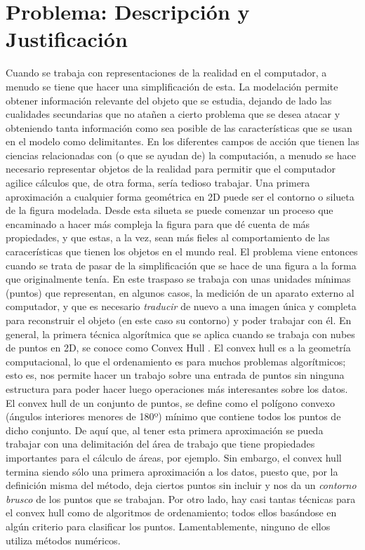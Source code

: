 \documentclass[final, 12pt letterpaper]{article}
\begin{document}
\section{Problema: Descripción y Justificación}
Cuando se trabaja con representaciones de la realidad en el computador, a menudo se tiene que hacer una simplificación de esta. La modelación permite obtener información relevante del objeto que se estudia, dejando de lado las cualidades secundarias que no atañen a cierto problema que se desea atacar y obteniendo tanta información como sea posible de las características que se usan en el modelo como delimitantes.
\newline
En los diferentes campos de acción que tienen las ciencias relacionadas con (o que se ayudan de) la computación, a menudo se hace necesario representar objetos de la realidad para permitir que el computador agilice cálculos que, de otra forma, sería tedioso trabajar. Una primera aproximación a cualquier forma geométrica en 2D puede ser el contorno o silueta de la figura modelada. Desde esta silueta se puede comenzar un proceso que encaminado a hacer más compleja la figura para que dé cuenta de más propiedades, y que estas, a la vez, sean más fieles al comportamiento de las caracerísticas que tienen los objetos en el mundo real.
\newline
El problema viene entonces cuando se trata de pasar de la simplificación que se hace de una figura a la forma que originalmente tenía. En este traspaso se trabaja con unas unidades mínimas (puntos) que representan, en algunos casos, la medición de un aparato externo al computador, y que es necesario \emph{traducir} de nuevo a una imagen única y completa para reconstruir el objeto (en este caso su contorno) y poder trabajar con él.
En general, la primera técnica algorítmica que se aplica cuando se trabaja con nubes de puntos en 2D, se conoce como Convex Hull \cite{PROGRAMMING}. El convex hull es a la geometría computacional, lo que el ordenamiento es para muchos problemas algorítmicos; esto es, nos permite hacer un trabajo sobre una entrada de puntos sin ninguna estructura para poder hacer luego operaciones más interesantes sobre los datos.
\newline 
El convex hull de un conjunto de puntos, se define como el polígono convexo (ángulos interiores menores de 180º) mínimo que contiene todos los puntos de dicho conjunto. De aquí que, al tener esta primera aproximación se pueda trabajar con una delimitación del área de trabajo que tiene propiedades importantes para el cálculo de áreas, por ejemplo. Sin embargo, el convex hull termina siendo sólo una primera aproximación a los datos, puesto que, por la definición misma del método, deja ciertos puntos sin incluir y nos da un \emph{contorno brusco} de los puntos que se trabajan. Por otro lado, hay casi tantas técnicas para el convex hull como de algoritmos de ordenamiento; todos ellos basándose en algún criterio para clasificar los puntos. Lamentablemente, ninguno de ellos utiliza métodos numéricos.
\end{document}

